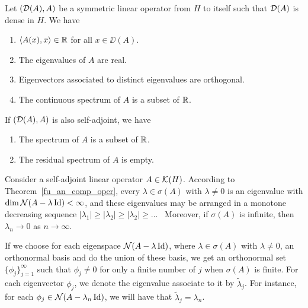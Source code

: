 \begin{theorem}
Let $(\mathcal{D}(A),A)$ be a symmetric linear operator from $H$
to itself such that $\mathcal{D}(A)$ is dense in $H$.  We have
\begin{enumerate}
\item $\left\langle{A(x)} , {x}\right\rangle \in \mathbb{R}$ for all $x \in \DD(A)$.
\item The eigenvalues of $A$ are real.
\item Eigenvectors associated to distinct eigenvalues are orthogonal.
\item The continuous spectrum of $A$ is a subset of $\mathbb{R}$.
\end{enumerate}
If $(\mathcal{D}(A),A)$ is also self-adjoint, we have
\begin{enumerate}
\item The spectrum of $A$ is a subset of $\mathbb{R}$.
\item The residual spectrum of $A$ is empty.
\end{enumerate}
\end{theorem}

Consider a self-adjoint linear operator $A \in \mathcal{K}(H)$.  According to
Theorem~\ref{fu_an_comp_oper}, every $\lambda \in \sigma(A)$ with
$\lambda \neq 0$ is an eigenvalue with
$\dim \mathcal{N}(A-\lambda\operatorname{Id}) < \infty$, and these
eigenvalues may be arranged in a monotone decreasing sequence
$\displaystyle |\lambda_1| \geq |\lambda_2| \geq |\lambda_2| \geq \ldots$
\ Moreover, if $\sigma(A)$ is infinite, then
$\lambda_n \rightarrow 0$ as $n\rightarrow \infty$.

If we choose for each eigenspace $\mathcal{N}(A-\lambda\operatorname{Id})$, where
$\lambda \in \sigma(A)$ with $\lambda \neq 0$, an orthonormal
basis and do the union of these basis, we get an orthonormal set
$\displaystyle \{ \phi_j \}_{j=1}^\infty$ such that $\phi_j \neq 0$ for only a finite
number of $j$ when $\sigma(A)$ is finite.
For each eigenvector $\phi_j$, we denote the eigenvalue associate to
it by $\tilde{\lambda}_j$.  For instance,
for each $\phi_j \in \mathcal{N}(A- \lambda_n \operatorname{Id})$, we will have that 
$\tilde{\lambda}_j = \lambda_n$.

